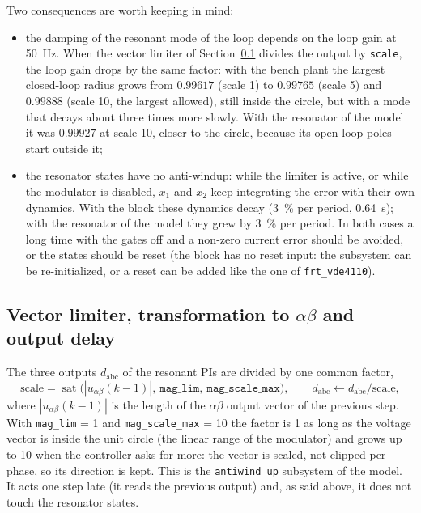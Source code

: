 \documentclass[11pt,a4paper]{scrartcl}
\newcommand{\ped}[1]{_{\mathrm{#1}}}
\newcommand{\code}[1]{\texttt{#1}}
\newcommand{\sat}{\operatorname{sat}}
\begin{document}
\begin{onehalfspace}
Two consequences are worth keeping in mind:
\begin{itemize}[nosep]
	\item the damping of the resonant mode of the loop depends on the loop gain at \SI{50}{\hertz}. When the vector limiter of Section~\ref{sec:limiter} divides the output by \code{scale}, the loop gain drops by the same factor: with the bench plant the largest closed-loop radius grows from $0.99617$ (scale 1) to $0.99765$ (scale 5) and $0.99888$ (scale 10, the largest allowed), still inside the circle, but with a mode that decays about three times more slowly. With the resonator of the model it was $0.99927$ at scale 10, closer to the circle, because its open-loop poles start outside it;
	\item the resonator states have no anti-windup: while the limiter is active, or while the modulator is disabled, $x_1$ and $x_2$ keep integrating the error with their own dynamics. With the block these dynamics decay (\SI{3}{\percent} per period, \SI{0.64}{\second}); with the resonator of the model they grew by \SI{3}{\percent} per period. In both cases a long time with the gates off and a non-zero current error should be avoided, or the states should be reset (the block has no reset input: the subsystem can be re-initialized, or a reset can be added like the one of \code{frt\_vde4110}).
\end{itemize}

\subsection{Vector limiter, transformation to $\alpha\beta$ and output delay}
\label{sec:limiter}

The three outputs $d\ped{abc}$ of the resonant PIs are divided by one common factor,
\begin{equation}
	\mathrm{scale} = \sat\!\big(|u_{\alpha\beta}(k-1)|,\ \code{mag\_lim},\ \code{mag\_scale\_max}\big), \qquad d\ped{abc} \leftarrow d\ped{abc}/\mathrm{scale},
	\label{eq:scale}
\end{equation}
where $|u_{\alpha\beta}(k-1)|$ is the length of the $\alpha\beta$ output vector of the previous step. With \code{mag\_lim} = 1 and \code{mag\_scale\_max} = 10 the factor is 1 as long as the voltage vector is inside the unit circle (the linear range of the modulator) and grows up to 10 when the controller asks for more: the vector is scaled, not clipped per phase, so its direction is kept. This is the \code{antiwind\_up} subsystem of the model. It acts one step late (it reads the previous output) and, as said above, it does not touch the resonator states.


\end{onehalfspace}
\end{document}
